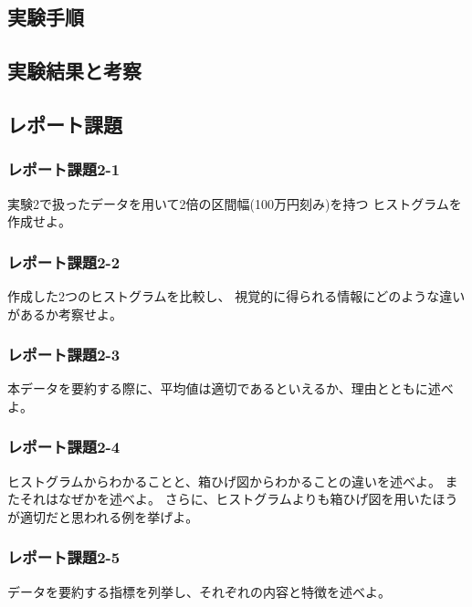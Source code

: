 \documentclass[12pt]{jarticle}
\begin{document}
\subsection{実験手順}
\subsection{実験結果と考察}
\subsection{レポート課題}
\subsubsection*{レポート課題2-1}
\begin{shadebox}
    実験2で扱ったデータを用いて2倍の区間幅(100万円刻み)を持つ
    ヒストグラムを作成せよ。
\end{shadebox}

\subsubsection*{レポート課題2-2}
\begin{shadebox}
    作成した2つのヒストグラムを比較し、
    視覚的に得られる情報にどのような違いがあるか考察せよ。
\end{shadebox}

\subsubsection*{レポート課題2-3}
\begin{shadebox}
    本データを要約する際に、平均値は適切であるといえるか、理由とともに述べよ。
\end{shadebox}

\subsubsection*{レポート課題2-4}
\begin{shadebox}
    ヒストグラムからわかることと、箱ひげ図からわかることの違いを述べよ。
    またそれはなぜかを述べよ。
    さらに、ヒストグラムよりも箱ひげ図を用いたほうが適切だと思われる例を挙げよ。
\end{shadebox}

\subsubsection*{レポート課題2-5}
\begin{shadebox}
    データを要約する指標を列挙し、それぞれの内容と特徴を述べよ。
\end{shadebox}
\end{document}
